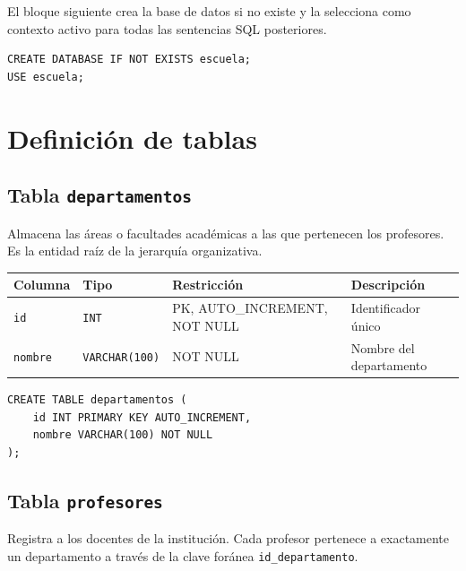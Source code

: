 \documentclass[12pt,a4paper]{article}
\begin{document}
El bloque siguiente crea la base de datos si no existe y la selecciona
como contexto activo para todas las sentencias SQL posteriores.

\begin{lstlisting}[caption={Creación y selección de la base de datos}]
CREATE DATABASE IF NOT EXISTS escuela;
USE escuela;
\end{lstlisting}

\section{Definición de tablas}

\subsection{Tabla \texttt{departamentos}}

Almacena las áreas o facultades académicas a las que pertenecen los
profesores. Es la entidad raíz de la jerarquía organizativa.

\begin{center}
\begin{tabular}{llll}
  \hline
  \textbf{Columna} & \textbf{Tipo} & \textbf{Restricción} & \textbf{Descripción} \\
  \hline
  \texttt{id}     & \texttt{INT}          & PK, AUTO\_INCREMENT, NOT NULL & Identificador único \\
  \texttt{nombre} & \texttt{VARCHAR(100)} & NOT NULL                      & Nombre del departamento \\
  \hline
\end{tabular}
\end{center}

\begin{lstlisting}[caption={SQL -- departamentos}]
CREATE TABLE departamentos (
    id INT PRIMARY KEY AUTO_INCREMENT,
    nombre VARCHAR(100) NOT NULL
);
\end{lstlisting}

\subsection{Tabla \texttt{profesores}}
 
Registra a los docentes de la institución. Cada profesor pertenece a
exactamente un departamento a través de la clave foránea
\texttt{id\_departamento}.
 
\end{document}
